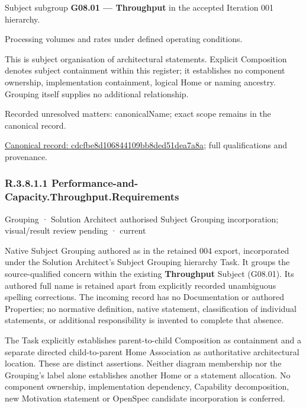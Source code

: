Subject subgroup \textbf{G08.01 — Throughput} in the accepted Iteration 001 hierarchy.



Processing volumes and rates under defined operating conditions.



This is subject organisation of architectural statements. Explicit Composition denotes subject containment within this register; it establishes no component ownership, implementation containment, logical Home or naming ancestry. Grouping itself supplies no additional relationship.


{\small Recorded unresolved matters: canonicalName; exact scope remains in the canonical record.}\par
{\footnotesize \href{../../../../continuum/grouping/cdcfbe8d106844109bb8ded51dea7a8a.md}{Canonical record: cdcfbe8d106844109bb8ded51dea7a8a}; full qualifications and provenance.}\par
\subsubsection*{R.3.8.1.1 Performance-and-Capacity.Throughput.Requirements}
\label{navigation:R.3.8.1.1}

\label{element:20326d2f4f2e44dcbe12db38deea02d0}
{\small Grouping · Solution Architect authorised Subject Grouping incorporation; visual/result review pending · current}\par

Native Subject Grouping authored as \texttt{} in the retained 004 export,
incorporated under the Solution Architect's Subject Grouping hierarchy Task.
It groups the source-qualified \texttt{} concern within
the existing \textbf{Throughput} Subject (G08.01). Its authored full name
is retained apart from explicitly recorded unambiguous spelling corrections.
The incoming record has no Documentation or authored Properties; no normative
definition, native statement, classification of individual statements, or
additional responsibility is invented to complete that absence.



The Task explicitly establishes parent-to-child Composition as containment and
a separate directed child-to-parent Home Association as authoritative architectural
location. These are distinct assertions. Neither diagram membership nor the
Grouping's label alone establishes another Home or a statement allocation.
No component ownership, implementation dependency, Capability decomposition,
new Motivation statement or OpenSpec candidate incorporation is conferred.



